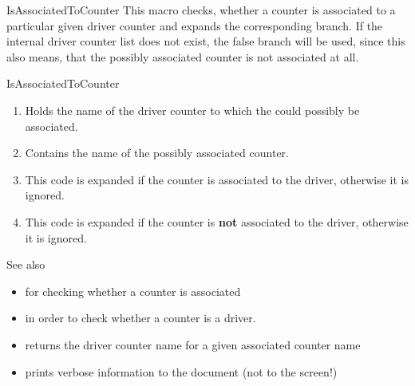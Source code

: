 \documentclass[12pt,paper=a4]{ltxdoc}
\begin{document}
\begin{docCommand}{IsAssociatedToCounter}{}
This macro checks, whether a counter is associated to a particular given driver counter and expands the corresponding branch. If the internal driver counter list does not exist, the false branch will be used, since this also means, that the possibly associated counter is not associated at all. 



\begin{docCommandArgs}{IsAssociatedToCounter}%

\begin{enumerate}[label={\textcolor{blue}{\#\arabic*}}]
  \item {} 

    Holds the name of the driver counter to which  the could possibly be associated.
\item {}

  Contains the name of the possibly associated counter.

\item {}

  This code is expanded if the counter is associated to the driver, otherwise it is ignored.

\item {}

  This code is expanded if the counter is \textbf{not} associated to the driver, otherwise it is ignored.

\end{enumerate}
\end{docCommandArgs}


\begin{dispExample}

\end{dispExample}

See also

\begin{itemize}
  \item {} for checking whether a counter is associated 
  \item {} in order to check whether a counter is a driver. 
  \item {} returns the driver counter name for a given associated counter name
  \item {} prints verbose information to the document (not to the screen!)
\end{itemize}


\end{docCommand}
\end{document}
